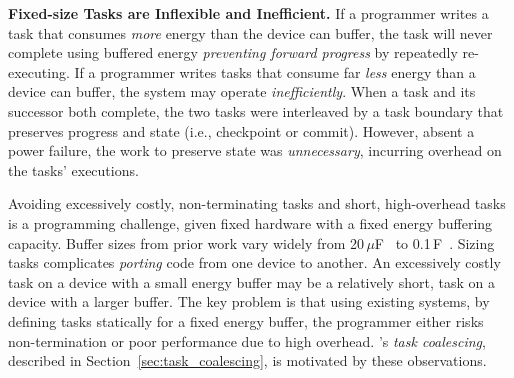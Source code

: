 \textbf{Fixed-size Tasks are Inflexible and Inefficient.} If a programmer writes a task that consumes {\em more} energy than the device can buffer, the task will never complete using buffered energy {\em preventing forward progress} by repeatedly re-executing. If a programmer writes tasks that consume far {\em less} energy than a device can buffer, the system may operate {\em inefficiently}. When a task and its successor both complete, the two tasks were interleaved by a task boundary that preserves progress and state (i.e., checkpoint or commit). However, absent a power failure, the work to preserve state was {\em unnecessary}, incurring overhead on the tasks' executions.

Avoiding excessively costly, non-terminating tasks and short, high-overhead tasks is a programming challenge, given fixed hardware with a fixed energy buffering capacity. Buffer sizes from prior work vary widely from 20\,$\mu $F~\cite{rodriguez_tbcs_2015} to 0.1\,F~\cite{moo}. Sizing tasks complicates {\em porting} code from one device to another. An excessively costly task on a device with a small energy buffer may be a relatively short, task on a device with a larger buffer. The key problem is that using existing systems, by defining tasks statically for a fixed energy buffer, the programmer either risks non-termination or poor performance due to high overhead. \sys's {\em task coalescing}, described
in Section~\ref{sec:task_coalescing}, is motivated by these observations.


